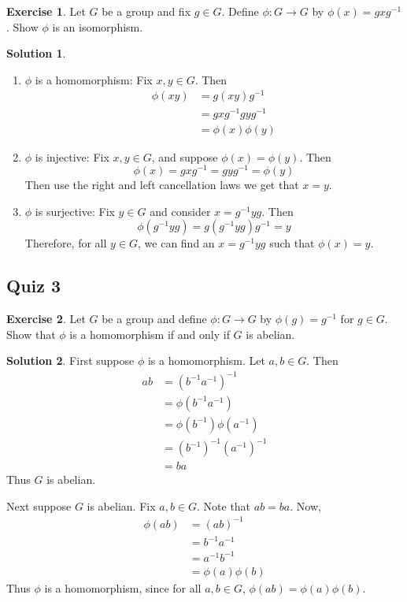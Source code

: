 \documentclass[12pt]{article}
\theoremstyle{definition}
\newtheorem{exercise}{\color{YellowOrange}Exercise}
\theoremstyle{definition}
\newtheorem{solution}{\color{Goldenrod}Solution}
\begin{document}
\begin{exercise}
Let $G$ be a group and fix $g \in G$. Define $\phi : G \to G$ by $\phi(x) = gxg^{-1}$. Show $\phi$ is an isomorphism.
\end{exercise}
\begin{solution}
\begin{enumerate}
	\item $\phi$ is a homomorphism: Fix $x, y \in G$. Then
	\begin{align*}
	\phi(xy) &= g (xy) g^{-1} \\
	&= g x g^{-1} g y g^{-1} \\
	&= \phi(x) \phi(y)
	\end{align*}
	\item $\phi$ is injective: Fix $x, y \in G$, and suppose $\phi(x)=\phi(y)$. Then
	\begin{equation}
		\phi(x) = g x g^{-1} = g y g^{-1} = \phi(y) 
	\end{equation}
	Then use the right and left cancellation laws we get that $x = y$.
	\item $\phi$ is surjective: Fix $y \in G$ and consider $x = g^{-1} y g$. Then
	\begin{equation}
		\phi(g^{-1}yg) = g (g^{-1}yg) g^{-1} = y
	\end{equation}
	Therefore, for all $y \in G$, we can find an $x = g^{-1} y g$ such that $\phi(x) = y$.
\end{enumerate}
\end{solution}

\subsection{Quiz 3}
\begin{exercise}
Let $G$ be a group and define $\phi : G \to G$ by $\phi(g) = g^{-1}$ for $g \in G$. Show that $\phi$ is a homomorphism if and only if $G$ is abelian.
\end{exercise}
\begin{solution}
	First suppose $\phi$ is a homomorphism. Let $a,b \in G$. Then
	\begin{align*}
		ab &= (b^{-1}a^{-1})^{-1} \\
		&= \phi(b^{-1}a^{-1}) \\
		&= \phi(b^{-1})\phi(a^{-1}) \\
		&= (b^{-1})^{-1} (a^{-1})^{-1} \\
		&= b a
	\end{align*}
	Thus $G$ is abelian. 

	Next suppose $G$ is abelian. Fix $a,b \in G$. Note that $ab = ba$. Now,
	\begin{align*}
	\phi(ab) &= (ab)^{-1} \tag{definition of $\phi$}\\
	&= b^{-1} a^{-1} \\
	&= a^{-1} b^{-1} \tag{$G$ abelian} \\
	&= \phi(a) \phi(b)
	\end{align*}
	Thus $\phi$ is a homomorphism, since for all $a,b \in G$, $\phi(ab) = \phi(a)\phi(b)$. 
\end{solution}
\end{document}
